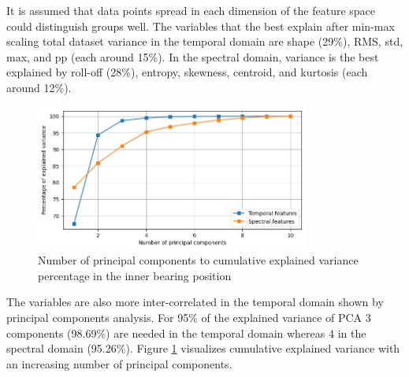 It is assumed that data points spread in each dimension of the feature space could distinguish groups well. The variables that the best explain after min-max scaling total dataset variance in the temporal domain are shape (29\%), RMS, std, max, and pp (each around 15\%). In the spectral domain, variance is the best explained by roll-off (28\%), entropy, skewness, centroid, and kurtosis (each around 12\%).
\begin{figure}[h!]
    \centering
    \includegraphics[width=0.8\textwidth]{assets/design/pca-explained-variance.png}
    \caption{Number of principal components to cumulative explained variance percentage in the inner bearing position}
    \label{fig:design:pca-explained-variance} 
\end{figure}

The variables are also more inter-correlated in the temporal domain shown by principal components analysis. For 95\% of the explained variance of PCA 3 components (98.69\%) are needed in the temporal domain whereas 4 in the spectral domain (95.26\%). Figure \ref{fig:design:pca-explained-variance} visualizes cumulative explained variance with an increasing number of principal components.


